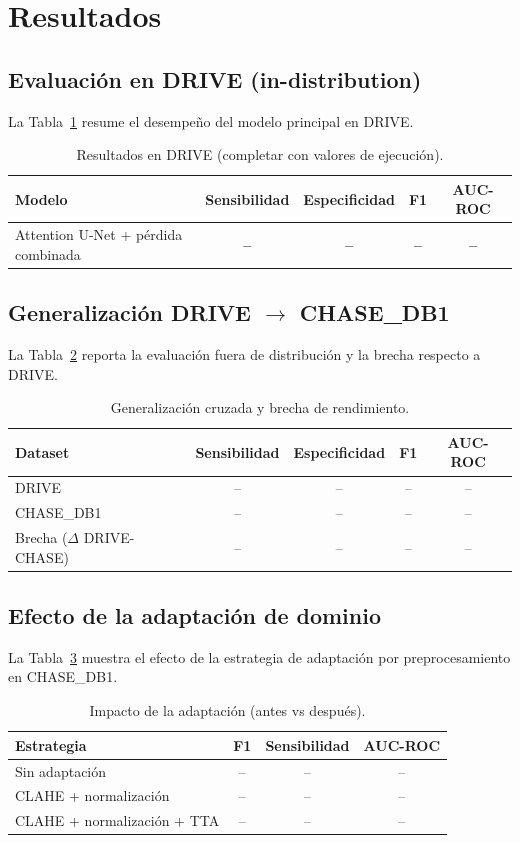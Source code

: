 \section{Resultados}
\subsection{Evaluación en DRIVE (in-distribution)}
La Tabla~\ref{tab:drive} resume el desempeño del modelo principal en DRIVE.

\begin{table}[h]
\centering
\caption{Resultados en DRIVE (completar con valores de ejecución).}
\label{tab:drive}
\begin{tabular}{lcccc}
\toprule
Modelo & Sensibilidad & Especificidad & F1 & AUC-ROC \\
\midrule
Attention U-Net + pérdida combinada & \textbf{--} & \textbf{--} & \textbf{--} & \textbf{--} \\
\bottomrule
\end{tabular}
\end{table}

\subsection{Generalización DRIVE $\rightarrow$ CHASE\_DB1}
La Tabla~\ref{tab:cross} reporta la evaluación fuera de distribución y la brecha respecto a DRIVE.

\begin{table}[h]
\centering
\caption{Generalización cruzada y brecha de rendimiento.}
\label{tab:cross}
\begin{tabular}{lcccc}
\toprule
Dataset & Sensibilidad & Especificidad & F1 & AUC-ROC \\
\midrule
DRIVE & -- & -- & -- & -- \\
CHASE\_DB1 & -- & -- & -- & -- \\
Brecha ($\Delta$ DRIVE-CHASE) & -- & -- & -- & -- \\
\bottomrule
\end{tabular}
\end{table}

\subsection{Efecto de la adaptación de dominio}
La Tabla~\ref{tab:adapt} muestra el efecto de la estrategia de adaptación por preprocesamiento en CHASE\_DB1.

\begin{table}[h]
\centering
\caption{Impacto de la adaptación (antes vs después).}
\label{tab:adapt}
\begin{tabular}{lccc}
\toprule
Estrategia & F1 & Sensibilidad & AUC-ROC \\
\midrule
Sin adaptación & -- & -- & -- \\
CLAHE + normalización & -- & -- & -- \\
CLAHE + normalización + TTA & -- & -- & -- \\
\bottomrule
\end{tabular}
\end{table}

